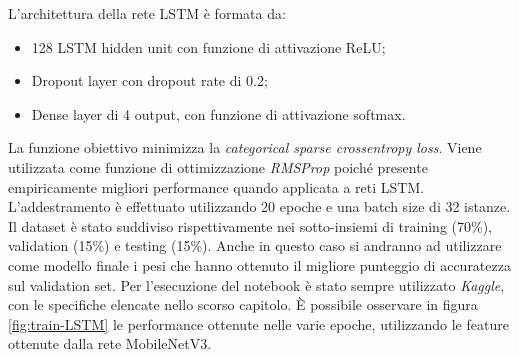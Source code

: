 \documentclass[11pt]{report}
\begin{document}
L'architettura della rete LSTM è formata da:
\begin{itemize}
    \item 128 LSTM hidden unit con funzione di attivazione ReLU;
    
    \item Dropout layer con dropout rate di 0.2;
    
    \item Dense layer di 4 output, con funzione di attivazione softmax.
    
\end{itemize}

La funzione obiettivo minimizza la \textit{categorical sparse crossentropy loss}. Viene utilizzata come funzione di ottimizzazione \textit{RMSProp} \cite{tieleman2012rmsprop} poiché presente empiricamente migliori performance quando applicata a reti LSTM. L'addestramento è effettuato utilizzando 20 epoche e una batch size di 32 istanze. Il dataset è stato suddiviso rispettivamente nei sotto-insiemi di training (70\%), validation (15\%) e testing (15\%). Anche in questo caso si andranno ad utilizzare come modello finale i pesi che hanno ottenuto il migliore punteggio di accuratezza sul validation set. Per l'esecuzione del notebook è stato sempre utilizzato \textit{Kaggle}, con le specifiche elencate nello scorso capitolo. È possibile osservare in figura \ref{fig:train-LSTM} le performance ottenute nelle varie epoche, utilizzando le feature ottenute dalla rete MobileNetV3.
\end{document}
